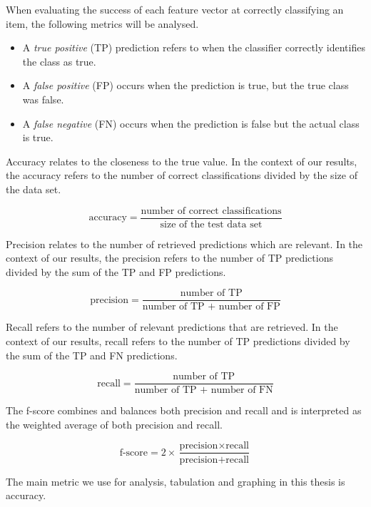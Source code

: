 When evaluating the success of each feature vector at correctly classifying an item, the following metrics will be analysed.

\begin{itemize}
\item A \emph{true positive} (TP) prediction refers to when the classifier correctly identifies the class as true. 
\item A \emph{false positive} (FP) occurs when the prediction is true, but the true class was false. 
\item A \emph{false negative} (FN) occurs when the prediction is false but the actual class is true.
\end{itemize}

Accuracy relates to the closeness to the true value. In the context of our results, the accuracy refers to the number of correct classifications 
divided by the size of the data set.

\[ \text{accuracy} = \frac{\text{number of correct classifications}}{\text{size of the test data set}}\]

Precision relates to the number of retrieved predictions which are relevant. In the context of our results, the precision refers to the number of TP predictions 
divided by the sum of the TP and FP predictions.

\[ \text{precision} = \frac{\text{number of TP}}{\text{number of TP + number of FP}}\]

Recall refers to the number of relevant predictions that are retrieved. In the context of our results, recall refers to the number of TP predictions 
divided by the sum of the TP and FN predictions.

\[ \text{recall} = \frac{\text{number of TP}}{\text{number of TP + number of FN}}\]

The f-score combines and balances both precision and recall and is interpreted as the weighted average of both precision and recall. 

\[ \text{f-score} = 2 \times \frac{\text{precision} \times \text{recall}}{\text{precision} + \text{recall}}\]

The main metric we use for analysis, tabulation and graphing in this thesis is accuracy.

